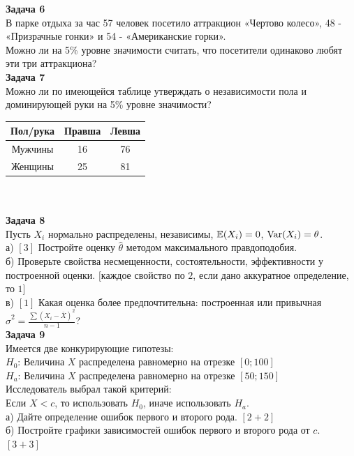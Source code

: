 \documentclass[12pt, a4paper]{article}\usepackage[]{graphicx}\usepackage[]{color}
\begin{document}
\textbf{Задача 6} \\ %
В парке отдыха за час 57 человек посетило аттракцион «Чертово
колесо», 48 - «Призрачные гонки» и 54 - «Американские горки».\\
Можно ли на 5\% уровне значимости считать, что посетители
одинаково любят эти три аттракциона? \\

\textbf{Задача 7} \\ %
Можно ли по имеющейся таблице утверждать о независимости пола и
доминирующей руки на 5\% уровне значимости? \\
\begin{tabular}{|c|c|c|}
  \hline
  Пол/рука & Правша & Левша \\
  \hline
  Мужчины & 16 & 76 \\
  Женщины & 25 & 81 \\
  \hline
\end{tabular} \\ \\


\textbf{Задача 8} \\ %
Пусть $X_{i}$ нормально распределены, независимы, $\mathbb{E}(X_{i})=0$,
$\operatorname{Var}(X_{i})=\theta$. \\
а) $[3]$ Постройте оценку $\hat{\theta}$ методом максимального
правдоподобия. \\
б) Проверьте свойства несмещенности, состоятельности,
эффективности у построенной оценки. $[$каждое свойство по $2$, если дано аккуратное определение, то $1]$  \\
в) $[1]$ Какая оценка более предпочтительна: построенная или
привычная
$\hat{\sigma}^{2}=\frac{\sum(X_{i}-\bar{X})^{2}}{n-1}$? \\


\textbf{Задача 9} \\ %
Имеется две конкурирующие гипотезы: \\
$H_{0}$: Величина $X$ распределена равномерно на отрезке $[0;100]$ \\
$H_{a}$: Величина $X$ распределена равномерно на отрезке $[50;150]$ \\
Исследователь выбрал такой критерий: \\
Если $X<c$, то использовать $H_{0}$, иначе использовать $H_{a}$. \\
а) Дайте определение ошибок первого и второго рода. $[2+2]$ \\
б) Постройте графики зависимостей ошибок первого и второго рода от
$c$. $[3+3]$\\
\end{document}
